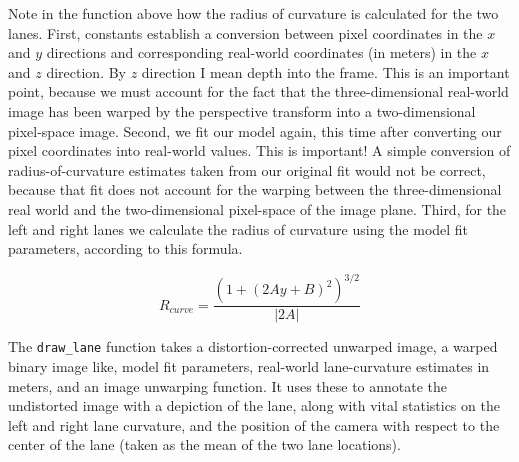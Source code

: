 \documentclass[11pt]{article}
\begin{document}
Note in the function above how the radius of curvature is
calculated for the two lanes.  First, constants establish a
conversion between pixel coordinates in the $x$ and $y$
directions and corresponding real-world coordinates (in meters)
in the $x$ and $z$ direction.  By $z$ direction I mean depth
into the frame.  This is an important point, because we must
account for the fact that the three-dimensional real-world image
has been warped by the perspective transform into a
two-dimensional pixel-space image.  Second, we fit our model
again, this time after converting our pixel coordinates into
real-world values.  This is important!  A simple conversion of
radius-of-curvature estimates taken from our original fit would
not be correct, because that fit does not account for the
warping between the three-dimensional real world and the
two-dimensional pixel-space of the image plane.  Third, for the
left and right lanes we calculate the radius of curvature using
the model fit parameters, according to this formula.

\[ R_{curve} = \frac{\left(1 + \left(2 A y +
      B\right)^2\right)^{3/2}}{\left| 2 A \right|} \]

The \texttt{draw\_lane} function takes a distortion-corrected unwarped
image, a warped binary image like, model fit parameters,
real-world lane-curvature estimates in meters, and an image
unwarping function.  It uses these to annotate the undistorted
image with a depiction of the lane, along with vital statistics
on the left and right lane curvature, and the position of the
camera with respect to the center of the lane (taken as the mean
of the two lane locations).
\end{document}
